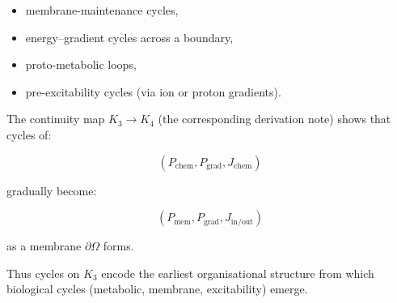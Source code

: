 \begin{itemize}
  \item membrane-maintenance cycles,
  \item energy–gradient cycles across a boundary,
  \item proto-metabolic loops,
  \item pre-excitability cycles (via ion or proton gradients).
\end{itemize}

The continuity map $K_3\to K_4$ (the corresponding derivation note)
shows that cycles of:

\[
  (P_{\mathrm{chem}}, P_{\mathrm{grad}}, J_{\mathrm{chem}})
\]

gradually become:

\[
  (P_{\mathrm{mem}}, P_{\mathrm{grad}}, J_{\mathrm{in/out}})
\]

as a membrane $\partial\Omega$ forms.

Thus cycles on $K_3$ encode the earliest organisational structure
from which biological cycles (metabolic, membrane, excitability)
emerge.
